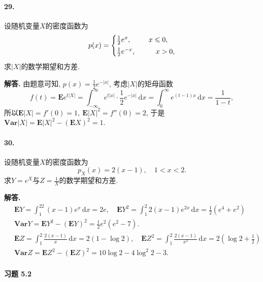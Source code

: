\documentclass[12pt, a4paper, oneside]{ctexart}
\newenvironment{solution}{\par\noindent\textbf{解答. }}{\bigskip\par}
\let\leq=\leqslant %
\def\d{\mathrm{d}}      %
\def\E{\textbf{E}}      %
\def\var{\textbf{Var}}  %
\def\add{\vspace{0.5ex}}  %
\def\del{\vspace{-3.5ex}}  %
\begin{document}
\paragraph{29.}设随机变量$X$的密度函数为
\begin{equation*}
    p(x) = \begin{cases}
        \frac{1}{2}e^x,&\quad x\leq 0,\add\\
        \frac{1}{2}e^{-x}, &\qquad x > 0,
    \end{cases}
\end{equation*}
求$|X|$的数学期望和方差.

\begin{solution}
    由题意可知, $p(x) = \frac{1}{2}e^{-|x|}$, 考虑$|X|$的矩母函数
    \begin{equation*}
        f(t) = \E e^{t|X|} = \int_{-\infty}^\infty e^{t|x|}\cdot \frac{1}{2}e^{-|x|}\,\d x = \int_0^{\infty}e^{(t-1)x}\,\d x = \frac{1}{1-t},
    \end{equation*}
    所以$\E |X| = f'(0) = 1,\ \E |X|^2 = f''(0) = 2$, 于是$\var |X| = \E |X|^2-(\E X)^2 = 1$.
\end{solution}
\paragraph{30.}设随机变量$X$的密度函数为
\begin{equation*}
    p_X(x) = 2(x-1),\quad 1 < x < 2.
\end{equation*}
求$Y=e^X$与$Z =\frac{1}{X}$的数学期望和方差.
\begin{solution}
    \begin{align*}
        &\ \E Y = \int_1^22(x-1)e^x\,\d x = 2e,\quad \E Y^2 = \int_1^2 2(x-1)e^{2x}\,\d x = \frac{1}{2}(e^4+e^2)\\
        &\ \var Y = \E Y^2 - (\E Y)^2 = \frac{1}{2}e^2(e^2 - 7).\\
        &\ \E Z = \int_1^2\frac{2(x-1)}{x}\,\d x = 2(1-\log 2),\quad \E Z^2 = \int_1^2\frac{2(x-1)}{x^2}\,\d x = 2(\log 2+\frac{1}{2})\\
        &\ \var Z = \E Z^2 - (\E Z)^2 = 10\log 2-4\log ^2 2-3.
    \end{align*}
\end{solution}\del\del
\paragraph{习题 5.2}
\end{document}
